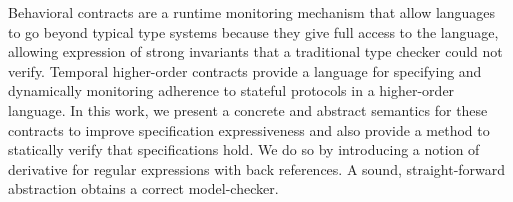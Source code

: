 Behavioral contracts are a runtime monitoring mechanism that allow languages to go beyond typical type systems because they give full access to the language, allowing expression of strong invariants that a traditional type checker could not verify.
%
Temporal higher-order contracts provide a language for specifying and dynamically monitoring adherence to stateful protocols in a higher-order language.
%
In this work, we present a concrete and abstract semantics for these contracts to improve specification expressiveness and also provide a method to statically verify that specifications hold.
%
We do so by introducing a notion of derivative for regular expressions with back references.
%
A sound, straight-forward abstraction obtains a correct
model-checker.
